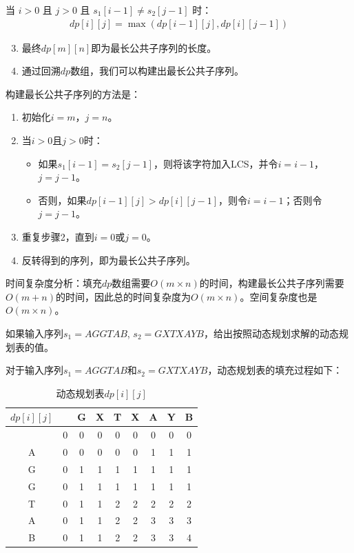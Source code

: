 \documentclass[12pt,twoside]{article}
\begin{document}
\begin{problems}
当 $i > 0$ 且 $j > 0$ 且 $s_1[i-1] \neq s_2[j-1]$ 时：
\begin{align}
dp[i][j] = \max(dp[i-1][j], dp[i][j-1])
\end{align}

\begin{enumerate}
    \setcounter{enumi}{2}
    \item 最终$dp[m][n]$即为最长公共子序列的长度。
    \item 通过回溯$dp$数组，我们可以构建出最长公共子序列。
\end{enumerate}

构建最长公共子序列的方法是：
\begin{enumerate}
    \item 初始化$i=m$，$j=n$。
    \item 当$i>0$且$j>0$时：
    \begin{itemize}
        \item 如果$s_1[i-1] = s_2[j-1]$，则将该字符加入LCS，并令$i=i-1$，$j=j-1$。
        \item 否则，如果$dp[i-1][j] > dp[i][j-1]$，则令$i=i-1$；否则令$j=j-1$。
    \end{itemize}
    \item 重复步骤2，直到$i=0$或$j=0$。
    \item 反转得到的序列，即为最长公共子序列。
\end{enumerate}

时间复杂度分析：填充$dp$数组需要$O(m \times n)$的时间，构建最长公共子序列需要$O(m + n)$的时间，因此总的时间复杂度为$O(m \times n)$。空间复杂度也是$O(m \times n)$。

\ppart 如果输入序列$s_1=AGGTAB$, $s_2=GXTXAYB$，给出按照动态规划求解的动态规划表的值。

对于输入序列$s_1=AGGTAB$和$s_2=GXTXAYB$，动态规划表的填充过程如下：

\begin{table}[h]
\centering
\renewcommand{\arraystretch}{1.2}
\begin{tabular}{c|cccccccc}
$dp[i][j]$ & & G & X & T & X & A & Y & B \\
\hline
 & 0 & 0 & 0 & 0 & 0 & 0 & 0 & 0 \\
A & 0 & 0 & 0 & 0 & 0 & 1 & 1 & 1 \\
G & 0 & 1 & 1 & 1 & 1 & 1 & 1 & 1 \\
G & 0 & 1 & 1 & 1 & 1 & 1 & 1 & 1 \\
T & 0 & 1 & 1 & 2 & 2 & 2 & 2 & 2 \\
A & 0 & 1 & 1 & 2 & 2 & 3 & 3 & 3 \\
B & 0 & 1 & 1 & 2 & 2 & 3 & 3 & 4 \\
\end{tabular}
\caption{动态规划表$dp[i][j]$}
\end{table}


\end{problems}
\end{document}
